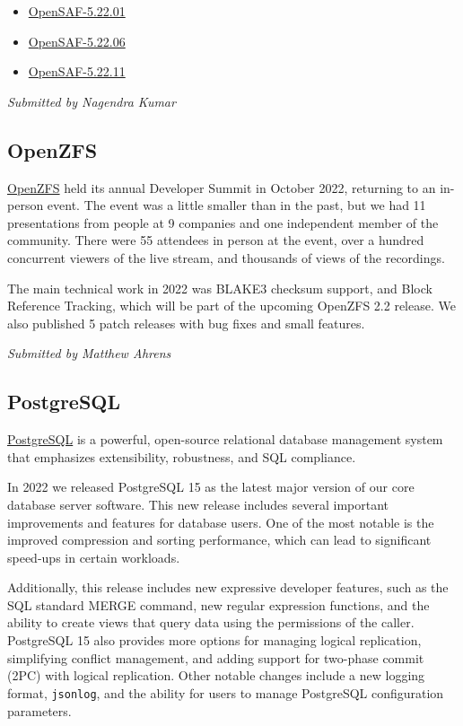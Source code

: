\documentclass[a4paper]{report}
\begin{document}
\begin{itemize}

\item \href{https://sourceforge.net/p/opensaf/wiki/NEWS-5.22.01/}{OpenSAF-5.22.01}
\item \href{https://sourceforge.net/p/opensaf/wiki/NEWS-5.22.06/}{OpenSAF-5.22.06}
\item \href{https://sourceforge.net/p/opensaf/wiki/NEWS-5.22.11/}{OpenSAF-5.22.11}

\end{itemize}

{\em Submitted by Nagendra Kumar}

\subsection{OpenZFS}

\href{https://openzfs.org/}{OpenZFS} held its annual Developer Summit in October 2022, returning to an in-person event. The event was a little smaller than in the past, but we had 11 presentations from people at 9 companies and one independent member of the community. There were 55 attendees in person at the event, over a hundred concurrent viewers of the live stream, and thousands of views of the recordings.

The main technical work in 2022 was BLAKE3 checksum support, and Block Reference Tracking, which will be part of the upcoming OpenZFS 2.2 release.  We also published 5 patch releases with bug fixes and small features.

{\em Submitted by Matthew Ahrens}

\subsection{PostgreSQL}

\href{https://www.postgresql.org/}{PostgreSQL} is a powerful, open-source relational database management system that emphasizes extensibility, robustness, and SQL compliance.

In 2022 we released PostgreSQL 15 as the latest major version of our core database server software. This new release includes several important improvements and features for database users. One of the most notable is the improved compression and sorting performance, which can lead to significant speed-ups in certain workloads.

Additionally, this release includes new expressive developer features, such as the SQL standard MERGE command, new regular expression functions, and the ability to create views that query data using the permissions of the caller. PostgreSQL 15 also provides more options for managing logical replication, simplifying conflict management, and adding support for two-phase commit (2PC) with logical replication.  Other notable changes include a new logging format, {\tt jsonlog}, and the ability for users to manage PostgreSQL configuration parameters.
\end{document}
